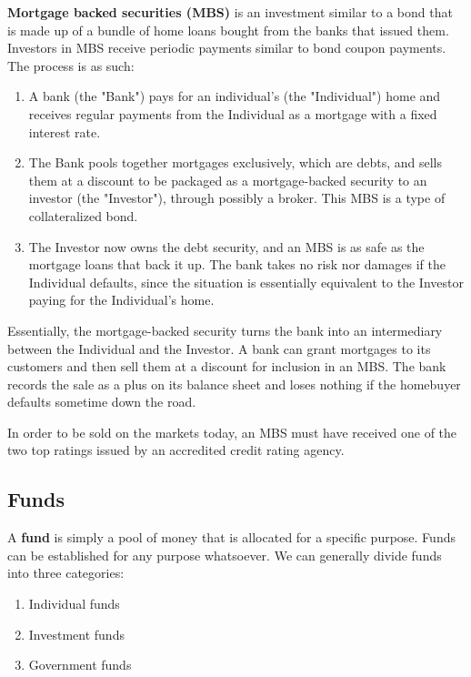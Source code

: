 \documentclass{article}
\begin{document}
    \begin{definition}[MBS]
      \label{def:mbs}
      \textbf{Mortgage backed securities (MBS)} is an investment similar to a bond that is made up of a bundle of home loans bought from the banks that issued them. Investors in MBS receive periodic payments similar to bond coupon payments. The process is as such: 
      \begin{enumerate}
        \item A bank (the "Bank") pays for an individual's (the "Individual") home and receives regular payments from the Individual as a mortgage with a fixed interest rate. 
        \item The Bank pools together mortgages exclusively, which are debts, and sells them at a discount to be packaged as a mortgage-backed security to an investor (the "Investor"), through possibly a broker. This MBS is a type of collateralized bond. 
        \item The Investor now owns the debt security, and an MBS is as safe as the mortgage loans that back it up. The bank takes no risk nor damages if the Individual defaults, since the situation is essentially equivalent to the Investor paying for the Individual's home. 
      \end{enumerate}
      Essentially, the mortgage-backed security turns the bank into an intermediary between the Individual and the Investor. A bank can grant mortgages to its customers and then sell them at a discount for inclusion in an MBS. The bank records the sale as a plus on its balance sheet and loses nothing if the homebuyer defaults sometime down the road. 

      In order to be sold on the markets today, an MBS must have received one of the two top ratings issued by an accredited credit rating agency. 
    \end{definition}

  \subsection{Funds}

    \begin{definition}[Funds]
      \label{def:funds}
      A \textbf{fund} is simply a pool of money that is allocated for a specific purpose. Funds can be established for any purpose whatsoever. We can generally divide funds into three categories: 
      \begin{enumerate}
        \item Individual funds
        \item Investment funds
        \item Government funds
      \end{enumerate}
    \end{definition}
\end{document}
